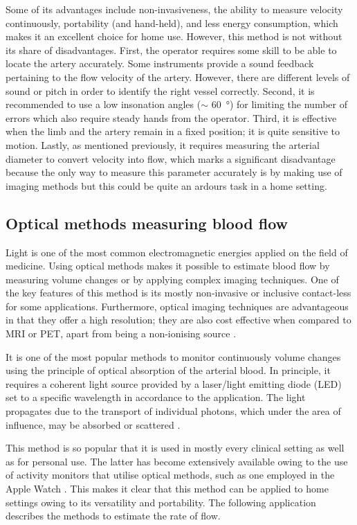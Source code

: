 Some of its advantages include non-invasiveness, the ability to measure velocity continuously, portability (and hand-held), and less energy consumption, which makes it an excellent choice for home use. However, this method is not without its share of disadvantages. First, the operator requires some skill to be able to locate the artery accurately. Some instruments provide a sound feedback pertaining to the flow velocity of the artery. However, there are different levels of sound or pitch in order to identify the right vessel correctly. Second, it is recommended to use a low insonation angles ($\sim$ \SI{60}{\degree}) for limiting the number of errors \cite{raadegran1999limb} which also require steady hands from the operator. Third, it is effective when the limb and the artery remain in a fixed position; it is quite sensitive to motion. Lastly, as mentioned previously, it requires measuring the arterial diameter to convert velocity into flow, which marks a significant disadvantage because the only way to measure this parameter accurately is by making use of imaging methods \cite{chapter4bloodflow} but this could be quite an ardours task in a home setting.

\subsection{Optical methods measuring blood flow}
\label{section literature Optic}
Light is one of the most common electromagnetic energies applied on the field of medicine. Using optical methods makes it possible to estimate blood flow by measuring volume changes or by applying complex imaging techniques. One of the key features of this method is its mostly non-invasive or inclusive contact-less for some applications. Furthermore, optical imaging techniques are advantageous in that they offer a high resolution; they are also cost effective when compared to MRI or PET, apart from being a non-ionising source \cite{jayanthy2011measuring}.

It is one of the most popular methods to monitor continuously volume changes using the principle of optical absorption of the arterial blood. In principle, it requires a coherent light source provided by a laser/light emitting diode (LED) set to a specific wavelength in accordance to the application. The light propagates due to the transport of individual photons, which under the area of influence, may be absorbed or scattered \cite{schmitt2003quantitative}. 

This method is so popular that it is used in mostly every clinical setting as well as for personal use. The latter has become extensively available owing to the use of activity monitors that utilise optical methods, such as one employed in the Apple Watch \cite{culbert2017user}. This makes it clear that this method can be applied to home settings owing to its versatility and portability. The following application describes the methods to estimate the rate of flow. 

